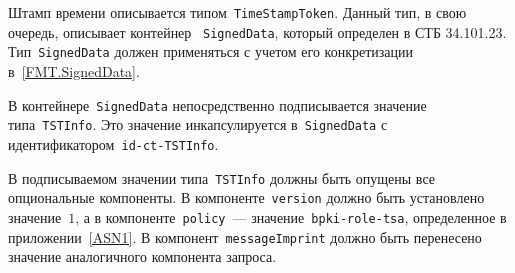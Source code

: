 Штамп времени описывается типом~\texttt{TimeStampToken}. 
Данный тип, в свою очередь, описывает контейнер ~\texttt{SignedData},
который определен в СТБ 34.101.23.
%
Тип~\texttt{SignedData} должен применяться с учетом его 
конкретизации в~\ref{FMT.SignedData}.

В контейнере~\texttt{SignedData} непосредственно подписывается 
значение типа~\texttt{TSTInfo}. Это значение инкапсулируется 
в~\texttt{SignedData} с идентификатором~\texttt{id-ct-TSTInfo}.

В подписываемом значении типа~\texttt{TSTInfo} должны быть опущены
все опциональные компоненты. 
%
В компоненте~\texttt{version} должно быть установлено значение~$1$,
а в компоненте~\texttt{policy}~--- значение~\texttt{bpki-role-tsa},
определенное в приложении~\ref{ASN1}.
%
В компонент~\texttt{messageImprint} должно быть перенесено
значение аналогичного компонента запроса.

